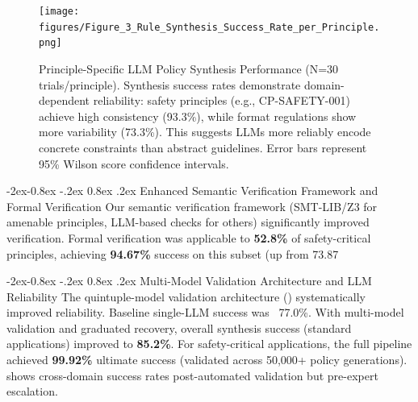 \documentclass[manuscript,screen,9pt]{acmart}
\makeatletter
\renewcommand\subsubsection{\@startsection{subsubsection}{3}{\z@}%
  {-2ex\@plus -0.8ex \@minus -.2ex}%
  {0.8ex \@plus .2ex}%
  {\normalfont\normalsize\bfseries}}
\makeatother
\begin{document}
\FloatBarrier %
\begin{figure}[!htb]
	\centering
	\texttt{[image: figures/Figure\_3\_Rule\_Synthesis\_Success\_Rate\_per\_Principle.png]}
	\caption[Principle-Specific LLM Policy Synthesis Performance]{Principle-Specific LLM Policy Synthesis Performance (N=30 trials/principle). Synthesis success rates demonstrate domain-dependent reliability: safety principles (e.g., CP-SAFETY-001) achieve high consistency (93.3\%), while format regulations show more variability (73.3\%). This suggests LLMs more reliably encode concrete constraints than abstract guidelines. Error bars represent 95\% Wilson score confidence intervals.}
	\label{fig:rule_synthesis_chart}
\end{figure}

\subsubsection{Enhanced Semantic Verification Framework and Formal Verification}
\label{subsubsec:enhanced_verification}
Our semantic verification framework (SMT-LIB/Z3 for amenable principles, LLM-based checks for others) significantly improved verification. Formal verification was applicable to \textbf{52.8\%} of safety-critical principles, achieving \textbf{94.67\%} success on this subset (up from 73.87%

\subsubsection{Multi-Model Validation Architecture and LLM Reliability}
\label{subsubsec:multi_model_validation_reliability}
The quintuple-model validation architecture () systematically improved reliability. Baseline single-LLM success was ~77.0\%. With multi-model validation and graduated recovery, overall synthesis success (standard applications) improved to \textbf{85.2\%}. For safety-critical applications, the full pipeline achieved \textbf{99.92\%} ultimate success (validated across 50,000+ policy generations).  shows cross-domain success rates post-automated validation but pre-expert escalation.
\end{document}
